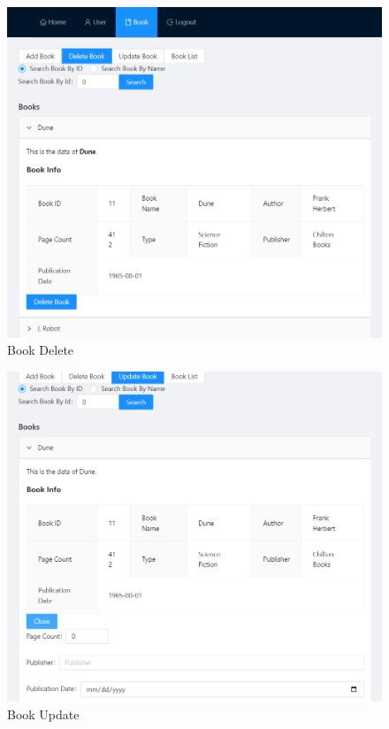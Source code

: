 \begin{minipage}{.49\textwidth}
  \begin{figure}[H]
    \centering
    \includegraphics[width=\linewidth]{img/front-end/book-delete.png}
    \caption{Book Delete}
  \end{figure}
\end{minipage}
\begin{minipage}{.49\textwidth}
  \begin{figure}[H]
    \centering
    \includegraphics[width=\linewidth]{img/front-end/book-update.png}
    \caption{Book Update}
  \end{figure}
\end{minipage}

